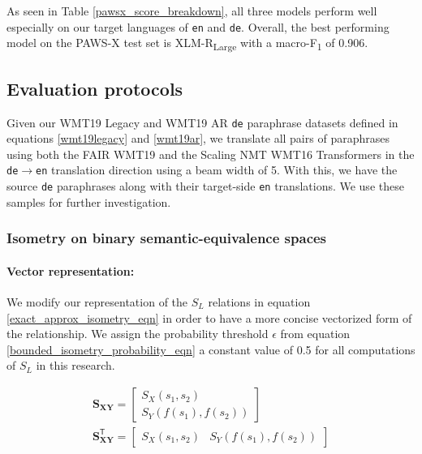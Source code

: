 \documentclass[11pt,a4paper]{article}
\begin{document}
As seen in Table \ref{pawsx_score_breakdown}, all three models perform well especially on our target languages of \texttt{en} and \texttt{de}. Overall, the best performing model on the PAWS-X test set is XLM-R\textsubscript{Large} with a macro-F\textsubscript{1} of 0.906.


\subsection{Evaluation protocols}

Given our WMT19 Legacy and WMT19 AR \texttt{de} paraphrase datasets defined in equations \ref{wmt19legacy} and \ref{wmt19ar}, we translate all pairs of paraphrases using both the FAIR WMT19 and the Scaling NMT WMT16 Transformers in the \texttt{de$\rightarrow$en} translation direction using a beam width of 5. With this, we have the source \texttt{de} paraphrases along with their target-side \texttt{en} translations. We use these samples for further investigation. 

\subsubsection{Isometry on binary semantic-equivalence spaces}

\paragraph{Vector representation:} We modify our representation of the $S_L$ relations in equation \ref{exact_approx_isometry_eqn} in order to have a more concise vectorized form of the relationship. We assign the probability threshold $\epsilon$ from equation \ref{bounded_isometry_probability_eqn} a constant value of 0.5 for all computations of $S_L$ in this research.

\vspace{-5pt}
\begin{gather}
  \mathbf{S_{XY}} = \begin{bmatrix} S_X(s_1, s_2) \\[5pt] S_Y(f(s_1), f(s_2)) \end{bmatrix} \\[10pt] 
  \mathbf{S_{XY}^{\mathsf{T}}} = \begin{bmatrix} S_X(s_1, s_2) & S_Y(f(s_1), f(s_2)) \end{bmatrix}
\end{gather}
\end{document}
